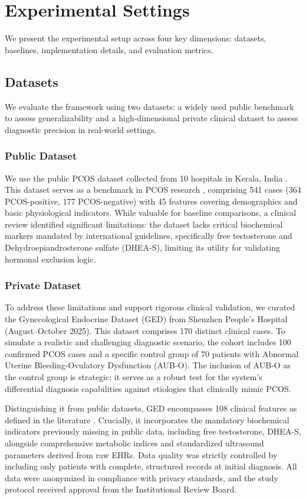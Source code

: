 \documentclass[a4paper,fleqn]{cas-dc}
\begin{document}
\section{Experimental Settings}
We present the experimental setup across four key dimensions: datasets, baselines, implementation details, and evaluation metrics.
\subsection{Datasets}
We evaluate the framework using two datasets: a widely used public benchmark to assess generalizability and a high-dimensional private clinical dataset to assess diagnostic precision in real-world settings.

\subsubsection{Public Dataset} We use the public PCOS dataset collected from 10 hospitals in Kerala, India \cite{pcosdataset}. This dataset serves as a benchmark in PCOS research \cite{18subha2024computational,34elmannai2023polycystic,57nasim2022novel,84kumari2023sms}, comprising 541 cases (364 PCOS-positive, 177 PCOS-negative) with 45 features covering demographics and basic physiological indicators. While valuable for baseline comparisons, a clinical review identified significant limitations: the dataset lacks critical biochemical markers mandated by international guidelines, specifically free testosterone and Dehydroepiandrosterone sulfate (DHEA-S), limiting its utility for validating hormonal exclusion logic.

\subsubsection{Private Dataset}
To address these limitations and support rigorous clinical validation, we curated the Gynecological Endocrine Dataset (GED) from Shenzhen People's Hospital (August–October 2025). This dataset comprises 170 distinct clinical cases. To simulate a realistic and challenging diagnostic scenario, the cohort includes 100 confirmed PCOS cases and a specific control group of 70 patients with Abnormal Uterine Bleeding-Ovulatory Dysfunction (AUB-O). The inclusion of AUB-O as the control group is strategic; it serves as a robust test for the system's differential diagnosis capabilities against etiologies that clinically mimic PCOS.

Distinguishing it from public datasets, GED encompasses 108 clinical features as defined in the literature \cite{li2025intelligent}. Crucially, it incorporates the mandatory biochemical indicators previously missing in public data, including free testosterone, DHEA-S, alongside comprehensive metabolic indices and standardized ultrasound parameters derived from raw EHRs. Data quality was strictly controlled by including only patients with complete, structured records at initial diagnosis. All data were anonymized in compliance with privacy standards, and the study protocol received approval from the Institutional Review Board.
\end{document}
